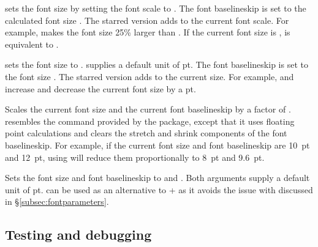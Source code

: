 \documentclass{beery}
\begin{document}
\nopagebreak\newline
{}

 sets the font size by setting the font scale to .
The font baselineskip is set to the calculated font size \texttimes{} .
The starred version  adds  to the current font scale.
For example,  makes the font size 25\% larger than .
If the current font size is ,  is equivalent to .

\nopagebreak\newline
{}

 sets the font size to .
 supplies a default unit of \unit{pt}.
The font baselineskip is set to the font size \texttimes{} .
The starred version  adds  to the current size.
For example,  and \marg{-1pt} increase and decrease the current font size by a \unit{pt}.

\KeepNextPar*

Scales the current font size and the current font baselineskip by a factor of .
 resembles the  command provided by the  package, except that it uses floating point calculations and clears the stretch and shrink components of the font baselineskip.
For example, if the current font size and font baselineskip are \qty{10}{pt} and \qty{12}{pt}, using  will reduce them proportionally to \qty{8}{pt} and \qty{9.6}{pt}.

\KeepNextPar*

Sets the font size and font baselineskip to  and .
Both arguments supply a default unit of \unit{pt}.
 can be used as an alternative to  +  as it avoids the issue with  discussed in \S\ref{subsec:fontparameters}.

\subsection{Testing and debugging}
\label{subsec:debug}
\end{document}

